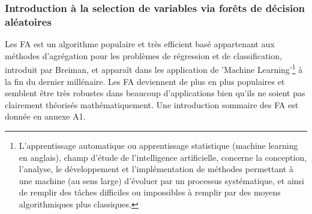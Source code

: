 	\subsubsection{Introduction à la selection de variables via forêts de décision aléatoires}
	Les FA est un algorithme populaire et très efficient basé appartenant aux méthodes d'agrégation pour les problèmes de régression et de classification, introduit par Breiman\cite{BREI01}, et apparaît dans les application de 'Machine Learning'\footnote{L'apprentissage automatique ou apprentissage statistique (machine learning en anglais), champ d'étude de l'intelligence artificielle, concerne la conception, l'analyse, le développement et l'implémentation de méthodes permettant à une machine (au sens large) d'évoluer par un processus systématique, et ainsi de remplir des tâches difficiles ou impossibles à remplir par des moyens algorithmiques plus classiques.} à la fin du dernier millénaire\cite{DITRI99}. Les FA deviennent de plus en plus populaires et semblent être très robustes dans beaucoup d'applications bien qu'ils ne soient pas clairement théorisés mathématiquement\cite{BIA08}. Une introduction sommaire des FA est donnée en annexe A1.
	\par


